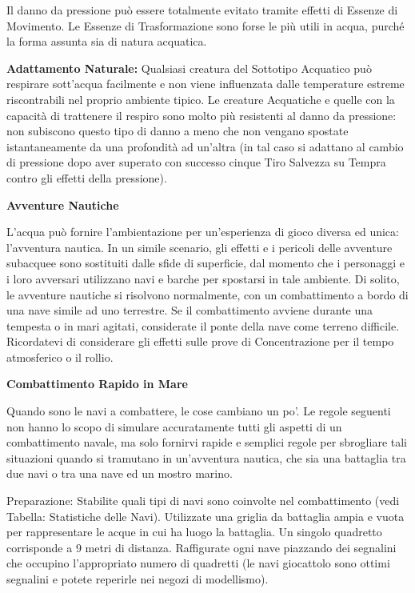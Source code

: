 \documentclass[a4paper,11pt,twoside,openany]{book}
\begin{document}
Il danno da pressione può essere totalmente evitato tramite effetti di Essenze di Movimento. Le Essenze di Trasformazione sono forse le più utili in acqua, purché la forma assunta sia di natura acquatica.

\textbf{Adattamento Naturale:} Qualsiasi creatura del Sottotipo Acquatico può respirare sott'acqua facilmente e non viene influenzata dalle temperature estreme riscontrabili nel proprio ambiente tipico. Le creature Acquatiche e quelle con la capacità di trattenere il respiro sono molto più resistenti al danno da pressione: non subiscono questo tipo di danno a meno che non vengano spostate istantaneamente da una profondità ad un'altra (in tal caso si adattano al cambio di pressione dopo aver superato con successo cinque Tiro Salvezza su Tempra contro gli effetti della pressione).

\textbf{Avventure Nautiche}

L'acqua può fornire l'ambientazione per un'esperienza di gioco diversa ed unica: l'avventura nautica. In un simile scenario, gli effetti e i pericoli delle avventure subacquee sono sostituiti dalle sfide di superficie, dal momento che i personaggi e i loro avversari utilizzano navi e barche per spostarsi in tale ambiente. Di solito, le avventure nautiche si risolvono normalmente, con un combattimento a bordo di una nave simile ad uno terrestre. Se il combattimento avviene durante una tempesta o in mari agitati, considerate il ponte della nave come terreno difficile. Ricordatevi di considerare gli effetti sulle prove di Concentrazione per il tempo atmosferico o il rollio.

\textbf{Combattimento Rapido in Mare}

Quando sono le navi a combattere, le cose cambiano un po'. Le regole seguenti non hanno lo scopo di simulare accuratamente tutti gli aspetti di un combattimento navale, ma solo fornirvi rapide e semplici regole per sbrogliare tali situazioni quando si tramutano in un'avventura nautica, che sia una battaglia tra due navi o tra una nave ed un mostro marino.

	{Preparazione:} Stabilite quali tipi di navi sono coinvolte nel combattimento (vedi Tabella: Statistiche delle Navi). Utilizzate una griglia da battaglia ampia e vuota per rappresentare le acque in cui ha luogo la battaglia. Un singolo quadretto corrisponde a 9 metri di distanza. Raffigurate ogni nave piazzando dei segnalini che occupino l'appropriato numero di quadretti (le navi giocattolo sono ottimi segnalini e potete reperirle nei negozi di modellismo).{}
\end{document}
